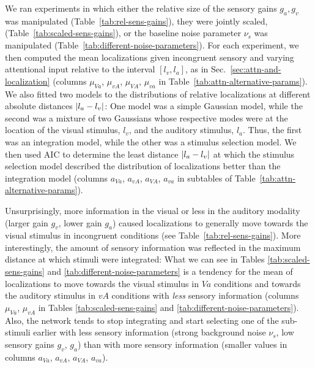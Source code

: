         We ran experiments in which either the relative size of the sensory gains $g_a,g_v$ was manipulated (Table~\ref{tab:rel-sens-gains}), they were jointly scaled, (Table~\ref{tab:scaled-sens-gains}), or the baseline noise parameter $\nu_s$ was manipulated (Table~\ref{tab:different-noise-parameters}).
        For each experiment, we then computed the mean localizations given incongruent sensory and varying attentional input relative to the interval $[l_v,l_a]$, as in Sec.~\ref{sec:attn-and-localization} (columns $\mu_\mathit{Va}$, $\mu_\mathit{vA}$, $\mu_\mathit{VA}$, $\mu_\mathit{va}$ in Table~\ref{tab:attn-alternative-params}).
        We also fitted two models to the distributions of relative localizations at different absolute distances $\lvert l_a-l_v\rvert$:
        One model was a simple Gaussian model, while the second was a mixture of two Gaussians whose respective modes were at the location of the visual stimulus, $l_v$, and the auditory stimulus, $l_a$.
        Thus, the first was an integration model, while the other was a stimulus selection model.
        We then used \ac{AIC} \citep{akaike-1974,deleeuw-1992} to determine the least distance $\lvert l_a-l_v\rvert$ at which the stimulus selection model described the distribution of localizations better than the integration model (columns $a_\mathit{Va}$, $a_\mathit{vA}$, $a_\mathit{VA}$, $a_\mathit{va}$ in subtables of Table~\ref{tab:attn-alternative-params}).%

        Unsurprisingly, more information in the visual or less in the auditory modality (larger gain $g_v$, lower gain $g_a$) caused localizations to generally move towards the visual stimulus in incongruent conditions (see Table~\ref{tab:rel-sens-gains}).
        More interestingly, the amount of sensory information was reflected in the maximum distance at which stimuli were integrated:
        What we can see in Tables \ref{tab:scaled-sens-gains} and \ref{tab:different-noise-parameters} is a tendency for the mean of localizations to move towards the visual stimulus in $\mathit{Va}$ conditions and towards the auditory stimulus in $\mathit{vA}$ conditions with \emph{less} sensory information (columns $\mu_\mathit{Va}$, $\mu_\mathit{vA}$ in Tables \ref{tab:scaled-sens-gains} and \ref{tab:different-noise-parameters}).
        Also, the network tends to stop integrating and start selecting one of the sub-stimuli earlier with less sensory information (strong background noise $\nu_s$, low sensory gains $g_v$, $g_a$) than with more sensory information (smaller values in columns $a_\mathit{Va}$, $a_\mathit{vA}$, $a_\mathit{VA}$, $a_\mathit{va}$).

